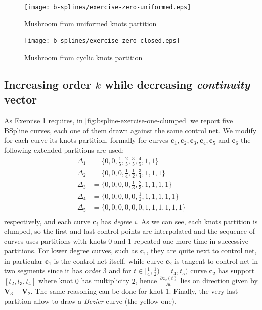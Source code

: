 \documentclass{article}
\begin{document}
\begin{figure}[h!]
  \centering
  \texttt{[image: b-splines/exercise-zero-uniformed.eps]}
  \caption{Mushroom from uniformed knots partition}
  \label{fig:uniformed-mushroom}
\end{figure}

\begin{figure}[h!]
  \centering
  \texttt{[image: b-splines/exercise-zero-closed.eps]}
  \caption{Mushroom from cyclic knots partition}
  \label{fig:closed-mushroom}
\end{figure}

\subsection{Increasing order $k$ while decreasing \emph{continuity} vector }
As Exercise 1 requires, in \autoref{fig:bspline-exercise-one-clumped} we
report five BSpline curves, each one of them drawn against the same control
net. We modify for each curve its knots partition, formally for curves
$\mathbf{c}_{1},\mathbf{c}_{2},\mathbf{c}_{3},\mathbf{c}_{4},\mathbf{c}_{5}$
and $\mathbf{c}_{6}$ the following extended partitions are used:
\begin{displaymath}
    \begin{split}
        \Delta_{1} &= \lbrace 0,0, \frac{1}{5}, \frac{2}{5},
            \frac{3}{5},\frac{4}{5},1,1 \rbrace \\
        \Delta_{2} &= \lbrace 0,0,0, \frac{1}{4},
            \frac{1}{2},\frac{3}{4},1,1,1 \rbrace \\
        \Delta_{3} &= \lbrace 0,0,0,0,
            \frac{1}{3},\frac{2}{3},1,1,1,1 \rbrace \\
        \Delta_{4} &= \lbrace 0,0,0,0,0,\frac{1}{2},
            1,1,1,1,1 \rbrace \\
        \Delta_{5} &= \lbrace 0,0,0,0,0,0,1,1,1,1,1,1 \rbrace \\
    \end{split}
\end{displaymath}
respectively, and each curve $\mathbf{c}_{i}$ has \emph{degree} $i$. As
we can see, each knots partition is clumped, so the first and last control points
are interpolated and the sequence of curves uses partitions with knots $0$ and $1$
repeated one more time in successive partitions. For lower degree curves, such as
$\mathbf{c}_{1}$, they are quite next to control net, in particular $\mathbf{c}_{1}$
is the control net itself, while curve $\mathbf{c}_{2}$ is tangent to control net
in two segments since it has \emph{order} $3$ and for $t \in [\frac{1}{4}, \frac{1}{2}) =
[t_4, t_5)$ curve $\mathbf{c}_{2}$ has support $[t_2,t_3,t_4]$ where knot $0$
has multiplicity $2$, hence $\frac{\partial \mathbf{c}_{2}(t)}{\partial t}$
lies on direction given by $\mathbf{V}_{3} - \mathbf{V}_{2}$.
The same reasoning can be done for knot $1$.
Finally, the very last partition allow to draw a \emph{Bezier} curve (the yellow one).
\end{document}
